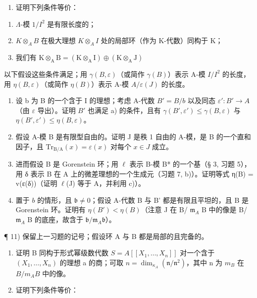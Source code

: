 \begin{enumerate}
\def\labelenumi{\alph{enumi})}
\tightlist
\item
  证明下列条件等价：
\end{enumerate}

\begin{enumerate}
\def\labelenumi{(\roman{enumi})}
\item
  \(\Lambda\)-模 \(1 / I^2\) 是有限长度的；
\item
  \(K \otimes_{A} B\) 在极大理想 \(K \otimes_{A} I\) 处的局部环（作为 K-代数）同构于 K；
\item
  我们有 \(\mathrm{K}\otimes_{\mathrm{A}}\mathrm{B} = (\mathrm{K}\otimes_{\mathrm{A}}\mathrm{I})\oplus (\mathrm{K}\otimes_{\mathrm{A}}\mathrm{J})\)
\end{enumerate}

以下假设这些条件满足；用 \(\gamma(B, \varepsilon)\)（或简作 \(\gamma(B)\)）表示 A-模 \(I/I^{2}\) 的长度，用 \(\eta(B, \varepsilon)\)（或简作 \(\eta(B)\)）表示 A-模 \(A/\varepsilon(J)\) 的长度。

\begin{enumerate}
\def\labelenumi{\alph{enumi})}
\setcounter{enumi}{1}
\item
  设 b 为 B 的一个含于 I 的理想；考虑 A-代数 \(B' = B/b\) 以及同态 \(\varepsilon': B' \to A\)（由 \(\varepsilon\) 导出）。证明 \(B'\) 也满足 a) 的条件，且有 \(\gamma(B', \varepsilon') \leqslant \gamma(B, \varepsilon)\) 与 \(\eta(B', \varepsilon') \leqslant \eta(B, \varepsilon)\)。
\item
  假设 A-模 B 是有限型自由的。证明 J 是秩 1 自由的 A-模，是 B 的一个直和因子，且 \(\mathrm{Tr}_{\mathrm{B / A}}(x) = \varepsilon (x)\) 对每个 \(x\in J\) 成立。
\item
  进而假设 B 是 Gorenstein 环；用 \(\ell\) 表示 B-模 B* 的一个基（§ 3, 习题 5），用 δ 表示 B 在 A 上的微差理想的一个生成元（习题 7, b)）。证明等式 η(B) = v(ε(δ))（证明 \(\ell\)(J) 等于 A，并利用 c)）。
\item
  置于 \(b\) 的情形，且 \(\mathfrak{b} \neq 0\)；假设 A-代数 B 与 B' 都是有限且平坦的，且 B 是 Gorenstein 环。证明有 \(\eta(B') < \eta(B)\)（注意 J 在 B/ \(\mathfrak{m}_{A}\) B 中的像是 B/ \(\mathfrak{m}_{A}\) B 的底座，故含于 \(\mathfrak{b}/\mathfrak{m}_{A}\mathfrak{b}\)）。
\end{enumerate}

¶ 11) 保留上一习题的记号；假设环 A 与 B 都是局部的且完备的。

\begin{enumerate}
\def\labelenumi{\alph{enumi})}
\item
  证明 B 同构于形式幂级数代数 \(S = A[[X_{1}, \ldots, X_{n}]]\) 对一个含于 \((X_{1}, \ldots, X_{n})\) 的理想 a 的商；可取 \(n = \dim_{\kappa_{A}}(\mathfrak{n}/\mathfrak{n}^{2})\)，其中 n 为 \(m_{B}\) 在 \(B/m_{A}B\) 中的像。
\item
  证明下列条件等价：
\end{enumerate}

